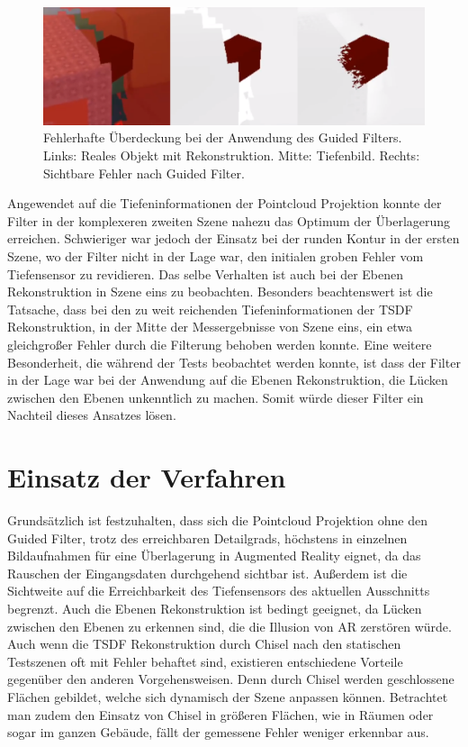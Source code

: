\begin{figure}[h]
  \centering
	\includegraphics[width=1.0\textwidth]{content/images/artifacts.png} 
  \caption{Fehlerhafte Überdeckung bei der Anwendung des Guided Filters. Links: Reales Objekt mit Rekonstruktion. Mitte: Tiefenbild. Rechts: Sichtbare Fehler nach Guided Filter.}
  \label{fig:artifacts}
\end{figure}

Angewendet auf die Tiefeninformationen der Pointcloud Projektion konnte der Filter in der komplexeren zweiten Szene nahezu das Optimum der Überlagerung erreichen. Schwieriger war jedoch der Einsatz bei der runden Kontur in der ersten Szene, wo der Filter nicht in der Lage war, den initialen groben Fehler vom Tiefensensor zu revidieren. Das selbe Verhalten ist auch bei der Ebenen Rekonstruktion in Szene eins zu beobachten. Besonders beachtenswert ist die Tatsache, dass bei den zu weit reichenden Tiefeninformationen der TSDF Rekonstruktion, in der Mitte der Messergebnisse von Szene eins, ein etwa gleichgroßer Fehler durch die Filterung behoben werden konnte. Eine weitere Besonderheit, die während der Tests beobachtet werden konnte, ist dass der Filter in der Lage war bei der Anwendung auf die Ebenen Rekonstruktion, die Lücken zwischen den Ebenen unkenntlich zu machen. Somit würde dieser Filter ein Nachteil dieses Ansatzes lösen.\\

\section{Einsatz der Verfahren}

Grundsätzlich ist festzuhalten, dass sich die Pointcloud Projektion ohne den Guided Filter, trotz des erreichbaren Detailgrads, höchstens in einzelnen Bildaufnahmen für eine Überlagerung in Augmented Reality eignet, da das Rauschen der Eingangsdaten durchgehend sichtbar ist. Außerdem ist die Sichtweite auf die Erreichbarkeit des Tiefensensors des aktuellen Ausschnitts begrenzt. Auch die Ebenen Rekonstruktion ist bedingt geeignet, da Lücken zwischen den Ebenen zu erkennen sind, die die Illusion von AR zerstören würde. Auch wenn die TSDF Rekonstruktion durch Chisel nach den statischen Testszenen oft mit Fehler behaftet sind, existieren entschiedene Vorteile gegenüber den anderen Vorgehensweisen. Denn durch Chisel werden geschlossene Flächen gebildet, welche sich dynamisch der Szene anpassen können. Betrachtet man zudem den Einsatz von Chisel in größeren Flächen, wie in Räumen oder sogar im ganzen Gebäude, fällt der gemessene Fehler weniger erkennbar aus.\\

